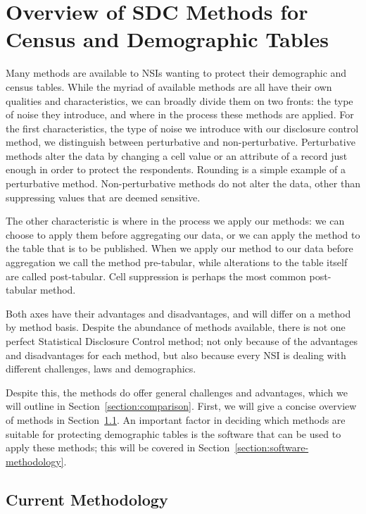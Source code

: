 \chapter{Overview of SDC Methods for Census and Demographic Tables}\label{ch:sdcmeth}

Many methods are available to NSIs wanting to protect their demographic and census tables. While the myriad of available methods are all have their own qualities and characteristics, we can broadly divide them on two fronts: the type of noise they introduce, and where in the process these methods are applied. For the first characteristics, the type of noise we introduce with our disclosure control method, we distinguish between perturbative and non-perturbative. Perturbative methods alter the data by changing a cell value or an attribute of a record just enough in order to protect the respondents. Rounding is a simple example of a perturbative method. Non-perturbative methods do not alter the data, other than suppressing values that are deemed sensitive.

The other characteristic is where in the process we apply our methods: we can choose to apply them before aggregating our data, or we can apply the method to the table that is to be published. When we apply our method to our data before aggregation we call the method pre-tabular, while alterations to the table itself are called post-tabular. Cell suppression is perhaps the most common post-tabular method. 

Both axes have their advantages and disadvantages, and will differ on a method by method basis. Despite the abundance of methods available, there is not one perfect Statistical Disclosure Control method; not only because of the advantages and disadvantages for each method, but also because every NSI is dealing with different challenges, laws and demographics. 

Despite this, the methods do offer general challenges and advantages, which we will outline in Section~\ref{section:comparison}. First, we will give a concise overview of methods in Section~\ref{section:overview}. An important factor in deciding which methods are suitable for protecting demographic tables is the software that can be used to apply these methods; this will be covered in Section~\ref{section:software-methodology}.


\section{Current Methodology}\label{section:overview}

